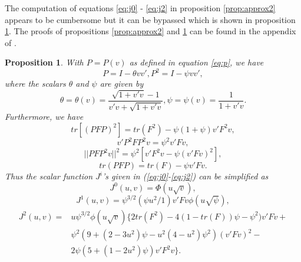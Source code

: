 \documentclass[a4paper]{article}
\newtheorem{prop}{Proposition}
\begin{document}
The computation of equations \ref{eq:j0} - \ref{eq:j2} in proposition \ref{prop:approx2} appears to be cumbersome but it can be bypassed which is shown in proposition \ref{prop:app2short}. The proofs of propositions \ref{prop:approx2} and \ref{prop:app2short} can be found in the appendix of \cite{sob}. 
\begin{prop}
\label{prop:app2short}
With $P = P(v)$ as defined in equation \ref{eq:p}, we have
$$P=I-\theta vv', P^2=I-\psi vv',$$
where the scalars $\theta$ and $\psi$ are given by
\begin{equation}
\theta=\theta(v)=\frac{\sqrt{1+v'v}-1}{v'v+\sqrt{1+v'v}},\psi=\psi(v)=\frac{1}{1+v'v}.
\end{equation}
Furthermore, we have
$$tr[(PFP)^2]=tr(F^2)-\psi(1+\psi)v'F^2v,$$
$$v'P^2FP^2v=\psi^2v'Fv,$$
$$||PFP^2v||^2=\psi^2[v'F^2v-\psi(v'Fv)^2],$$
$$tr(PFP)=tr(F)-\psi v'Fv.$$
Thus the scalar function $J^i$'s given in (\ref{eq:j0}-\ref{eq:j2}) can be simplified as
\begin{equation}
J^0(u,v)=\Phi(u\sqrt{v}),
\end{equation}
\begin{equation}
J^1(u,v)=\psi^{3/2}(\psi u^2/1)v'Fv\phi(u\sqrt{\psi}),
\end{equation}
\begin{equation}
\begin{split}
J^2(u,v)=&u\psi^{3/2}\phi(u\sqrt{v})\big\{2tr(F^2) - 4(1-tr(F))\psi-\psi^2)v'Fv+ \\
	& \psi^2(9+(2-3u^2)\psi-u^2(4-u^2)\psi^2)(v'Fv)^2-\\
	&2\psi(5+(1-2u^2)\psi)v'F^2v\big\}.
\end{split}
\end{equation}
\end{prop}

\newpage
\end{document}
